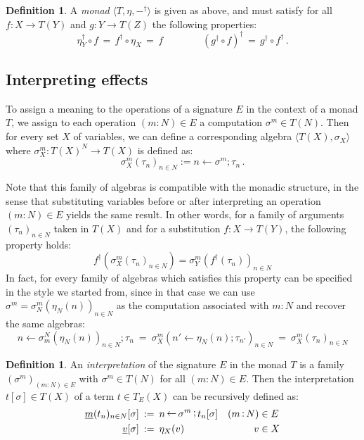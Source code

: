 \documentclass[11pt,oneside,draft]{book}
\theoremstyle{definition}
\newtheorem{definition}[theorem]{Definition}
\newcommand{\ul}[1]{%
  \underline{\smash{#1}}
}
\begin{document}
\begin{definition} \label{def:setmonad}
A \emph{monad} $\langle T, \eta, {-}^\dagger \rangle$
is given as above,
and must satisfy
for all $f : X \rightarrow T(Y)$ and
$g : Y \rightarrow T(Z)$
the following properties:
\[
  \eta_Y^\dagger \circ f \, = \,
  f^\dagger \circ \eta_X \, = \,
  f
  \qquad \qquad
  (g^\dagger \circ f)^\dagger \, = \,
  g^\dagger \circ f^\dagger
  \,.
\]
\end{definition}


\subsection{Interpreting effects} %

To assign a meaning to the operations of a signature $E$
in the context of a monad $T$,
we assign
to each operation $(m \mathop: N) \in E$
a computation $\sigma^m \in T(N)$.
Then for every set $X$ of variables,
we can define a corresponding algebra $\langle T(X), \sigma_X \rangle$
where $\sigma_X^m : T(X)^N \rightarrow T(X)$
is defined as:
\[
  \sigma_X^m(\tau_n)_{n \in N} :=
    n \mathop\leftarrow \sigma^m \mathop; \tau_n
  \,.
\]

Note that this family of algebras
is compatible with the monadic structure,
in the sense that substituting variables
before or after interpreting an operation $(m \mathop: N) \in E$
yields the same result.
In other words,
for a family of arguments $(\tau_n)_{n \in N}$ taken in $T(X)$
and for a substitution $f : X \rightarrow T(Y)$,
the following property holds:
\begin{equation} \label{eqn:monadint}
  f^\dagger(\sigma_X^m(\tau_n)_{n \in N}) =
  \sigma_Y^m(f^\dagger(\tau_n))_{n \in N}
\end{equation}
In fact,
for every family of algebras which satisfies this property
can be specified in the style we started from,
since in that case we can use
$\sigma^m = \sigma_N^m(\eta_N(n))_{n \in N}$
as the computation associated with $m \mathop: N$
and recover the same algebras:
\[
  n \mathop\leftarrow \sigma^N_m(\eta_N(n))_{n \in N} \mathop; \tau_n
  \: = \:
  \sigma^m_X(n' \mathop\leftarrow \eta_N(n) \mathop; \tau_{n'})_{n \in N}
  \: = \:
  \sigma^m_X(\tau_n)_{n \in N}
\]

\begin{definition}
An \emph{interpretation} of the signature $E$ in the monad $T$
is a family $(\sigma^m)_{(m \mathop: N) \in E}$
with $\sigma^m \in T(N)$ for all $(m \mathop: N) \in E$.
Then the interpretation $t[\sigma] \in T(X)$
of a term $t \in T_E(X)$
can be recursively defined as:
\begin{align*}
  \ul{m}(t_n)_{n \in N}[\sigma] \: &:= \:
    n \mathop\leftarrow \sigma^m \mathop; t_n[\sigma]
    & (m \mathop: N) &\in E
  \\
  \ul{v}[\sigma] \: &:= \: \eta_X(v)
    & v &\in X
\end{align*}
\end{definition}
\end{document}
